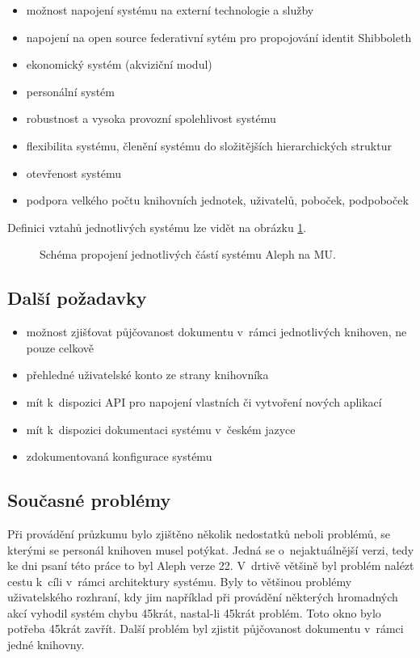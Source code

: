 \documentclass[
	11pt, oneside, printed, final, palatino, monochrome
	microtype,
	table,   %
	lof,     %
	lot     %
]{fithesis3}
\newcommand{\mezera}{\bigskip}
\begin{document}
{\begin{itemize}
\item možnost napojení systému na externí technologie a služby
\item napojení na open source federativní sytém pro propojování identit Shibboleth
\item ekonomický systém (akviziční modul)
\item personální systém
\item robustnost a vysoka provozní spolehlivost systému
\item flexibilita systému, členění systému do složitějších hierarchických struktur
\item otevřenost systému
\item podpora velkého počtu knihovních jednotek, uživatelů, poboček, podpoboček
\end{itemize}

Definici vztahů jednotlivých systému lze vidět na obrázku \ref{fig:aleph}.
\mezera

\begin{figure}
    \centering
	\def\svgwidth{1.4\textwidth}
    
	\caption{Schéma propojení jednotlivých částí systému Aleph na MU.}
	\label{fig:aleph}
\end{figure}

\subsection{Další požadavky}

\begin{itemize}
\item možnost zjišťovat půjčovanost dokumentu v~rámci jednotlivých knihoven, ne pouze celkově
\item přehledné uživatelské konto ze strany knihovníka
\item mít k~dispozici API pro napojení vlastních či vytvoření nových aplikací
\item mít k~dispozici dokumentaci systému v~českém jazyce
\item zdokumentovaná konfigurace systému
\end{itemize}


\subsection{Současné problémy}
Při provádění průzkumu bylo zjištěno několik nedostatků neboli problémů, se kterými se personál knihoven musel potýkat. Jedná se o~nejaktuálnější verzi, tedy ke dni psaní této práce to byl Aleph verze 22. V~drtivě většině byl problém nalézt cestu k~cíli v~rámci architektury systému. Byly to většinou problémy uživatelského rozhraní, kdy jim například při provádění některých hromadných akcí vyhodil systém chybu 45krát, nastal-li 45krát problém. Toto okno bylo potřeba 45krát zavřít. Další problém byl zjistit půjčovanost dokumentu v~rámci jedné knihovny.

}
\end{document}
